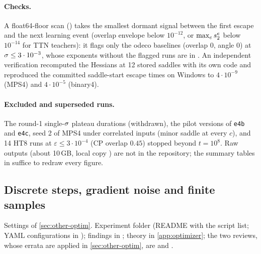 \paragraph{Checks.}
A float64-floor scan () takes the smallest dormant signal between the first
escape and the next learning event (overlap envelope below $10^{-12}$, or $\max_es^{e}_{2}$ below $10^{-14}$ for TTN
teachers): it flags only the odeco baselines (overlap $0$, angle $0$) at $\sigma\le3\cdot10^{-3}$, whose exponents
without the flagged runs are in . An independent verification
recomputed the Hessians at 12 stored saddles with its own code and reproduced the committed saddle-start escape
times on Windows to $4\cdot10^{-9}$ (MPS4) and $4\cdot10^{-5}$ (binary4).

\paragraph{Excluded and superseded runs.}
The round-1 single-$\sigma$ plateau durations (withdrawn), the pilot versions of \texttt{e4b} and \texttt{e4c}, seed 2 of
MPS4 under correlated inputs (minor saddle at every $c$), and 14 HT8 runs at $\varepsilon\le3\cdot10^{-4}$ (CP overlap
$0.45$) stopped beyond $t=10^8$. Raw outputs (about 10\,GB, local copy ) are not in the
repository; the summary tables in  suffice to redraw every figure.

\subsection{Discrete steps, gradient noise and finite samples}\label{app:exp-optim}
Settings of \cref{sec:other-optim}. Experiment folder  (README with
the script list; YAML configurations in ); findings in ; theory
in \cref{app:optimizer}; the two reviews, whose errata are applied in \cref{sec:other-optim}, are
 and .


